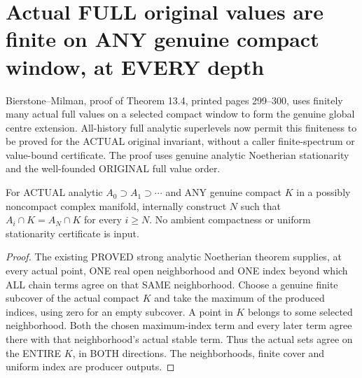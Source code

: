 \section{Actual FULL original values are finite on ANY genuine compact window, at EVERY depth}

Bierstone--Milman\cite{bierstone-milman97-invent-math}, proof of Theorem
13.4, printed pages 299--300, uses finitely many actual full values on a
selected compact window to form the genuine global centre extension.
All-history full analytic superlevels now permit this finiteness to be
proved for the ACTUAL original invariant, without a caller finite-spectrum
or value-bound certificate. The proof uses genuine analytic Noetherian
stationarity and the well-founded ORIGINAL full value order.

\begin{lemma}
\label{hir:actual-analytic-descending-chain-compact-window-stationary}
\leanok
For ACTUAL analytic $A_0\supset A_1\supset\cdots$ and ANY genuine compact
$K$ in a possibly noncompact complex manifold, internally construct $N$
such that $A_i\cap K=A_N\cap K$ for every $i\ge N$. No ambient compactness
or uniform stationarity certificate is input.
\end{lemma}
\begin{proof}
The existing PROVED strong analytic Noetherian theorem supplies, at every
actual point, ONE real open neighborhood and ONE index beyond which ALL
chain terms agree on that SAME neighborhood. Choose a genuine finite
subcover of the actual compact $K$ and take the maximum of the produced
indices, using zero for an empty subcover. A point in $K$ belongs to some
selected neighborhood. Both the chosen maximum-index term and every later
term agree there with that neighborhood's actual stable term. Thus the
actual sets agree on the ENTIRE $K$, in BOTH directions. The neighborhoods,
finite cover and uniform index are producer outputs.
\end{proof}

